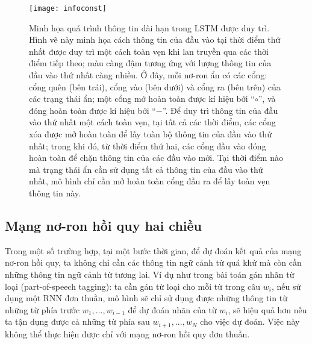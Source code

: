 \begin{figure}
	\centering
	\texttt{[image: infoconst]}
	\caption[Minh họa quá trình thông tin dài hạn trong LSTM được duy trì]{Minh họa quá trình thông tin dài hạn trong LSTM được duy trì. Hình vẽ này minh họa cách thông tin của đầu vào tại thời điểm thứ nhất được duy trì một cách toàn vẹn khi lan truyền qua các thời điểm tiếp theo; màu càng đậm tương ứng với lượng thông tin của đầu vào thứ nhất càng nhiều. Ở đây, mỗi nơ-ron ẩn có các cổng: cổng quên (bên trái), cổng vào (bên dưới) và cổng ra (bên trên) của các trạng thái ẩn; một cổng mở hoàn toàn được kí hiệu bởi “$\circ$”, và đóng hoàn toàn được kí hiệu bởi “$-$”. Để duy trì thông tin của đầu vào thứ nhất một cách toàn vẹn, tại tất cả các thời điểm, các cổng xóa được mở hoàn toàn để lấy toàn bộ thông tin của đầu vào thứ nhất; trong khi đó, từ thời điểm thứ hai, các cổng đầu vào đóng hoàn toàn để chặn thông tin của các đầu vào mới. Tại thời điểm nào mà trạng thái ẩn cần sử dụng tất cả thông tin của đầu vào thứ nhất, mô hình chỉ cần mở hoàn toàn cổng đầu ra để lấy toàn vẹn thông tin này.}
	\label{fig_infoconst}
\end{figure}



\subsection{Mạng nơ-ron hồi quy hai chiều}

Trong một số trường hợp, tại một bước thời gian, để dự đoán kết quả của mạng nơ-ron hồi quy, ta không chỉ cần các thông tin ngữ cảnh từ quá khứ mà còn cần những thông tin ngữ cảnh từ tương lai. Ví dụ như trong bài toán gán nhãn từ loại (part-of-speech tagging): ta cần gán từ loại cho mỗi từ trong câu $w_i$, nếu sử dụng một RNN đơn thuần, mô hình sẽ chỉ sử dụng được những thông tin từ những từ phía trước $w_1,...,w_{i-1}$ để dự đoán nhãn của từ $w_i$, sẽ hiệu quả hơn nếu ta tận dụng được cả những từ phía sau $w_{i+1},...,w_{N}$ cho việc dự đoán. Việc này không thể thực hiện được chỉ với mạng nơ-ron hồi quy đơn thuần. 

